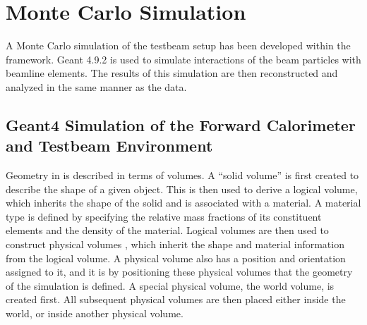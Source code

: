 \section{Monte Carlo Simulation}


A Monte Carlo simulation of the testbeam setup has been developed within the \athena framework.  Geant 4.9.2 \cite{geant4} is used to simulate interactions of the beam particles with beamline elements. The results of this simulation are then reconstructed and analyzed in the same manner as the data.

\subsection{Geant4 Simulation of the Forward Calorimeter and Testbeam Environment}
\label{TB_overview_g4}
Geometry in \geant is described in terms of volumes. A ``solid volume'' is first created to describe the shape of a given object. This is then used to derive a logical volume, which inherits the shape of the solid and is associated with a material. A material type is defined by specifying the relative mass fractions  of its constituent elements and the density of the material. Logical volumes are then used to construct physical volumes , which inherit the shape and material information from the logical volume. A physical volume also has a position and orientation assigned to it, and it is by positioning these physical volumes that the geometry of the simulation is defined. A special physical volume, the world volume, is created first. All subsequent physical volumes are then placed either inside the world, or inside another physical volume. 

